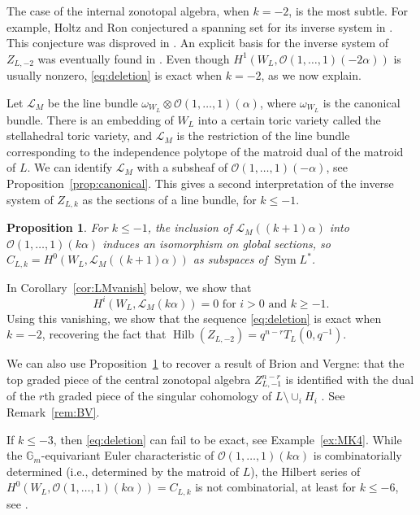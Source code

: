 \documentclass{amsart}
\newtheorem{proposition}[theorem]{Proposition}
\newcommand{\Hilb}{\operatorname{Hilb}}
\theoremstyle{definition}
\begin{document}
The case of the internal zonotopal algebra, when $k=-2$, is the most 
subtle. For example, Holtz and Ron conjectured a spanning set for its 
inverse system in \cite[Conjecture 6.1]{HoltzRon}. This conjecture was 
disproved in \cite{APCorrection}. An explicit basis for the inverse system of $Z_{L, -2}$ was eventually found in \cite[Section 4.5]{GillespieThesis}. Even though $H^1(W_L, \mathcal{O}(1, \dotsc, 1)(-2\alpha))$ is usually nonzero, \eqref{eq:deletion} is exact when $k=-2$, as we now explain. 

\medskip

Let $\mathcal{L}_M$ be the line bundle $\omega_{W_L} \otimes \mathcal{O}(1, \dotsc, 1)(\alpha)$, where $\omega_{W_L}$ is the canonical bundle. There is an embedding of $W_L$ into a certain toric variety called the stellahedral toric variety, and $\mathcal{L}_M$ is the restriction of the line bundle corresponding to the independence polytope of the matroid dual of the matroid of $L$. We can identify $\mathcal{L}_M$ with a subsheaf of $\mathcal{O}(1, \dotsc, 1)(-\alpha)$, see Proposition~\ref{prop:canonical}. This gives a second interpretation of the inverse system of $Z_{L, k}$ as the sections of a line bundle, for $k \le -1$. 

\begin{proposition}\label{prop:LM}
For $k \le -1$, the inclusion of $\mathcal{L}_M((k+1)\alpha)$ into $\mathcal{O}(1, \dotsc, 1)(k\alpha)$ induces an isomorphism on global sections, so $C_{L, k} = H^0(W_L, \mathcal{L}_M((k+1)\alpha))$ as subspaces of $\operatorname{Sym} L^*$.
\end{proposition}

In Corollary~\ref{cor:LMvanish} below, we show that
$$H^i(W_L, \mathcal{L}_M(k\alpha)) = 0 \text{ for }i >0 \text{ and }k \ge -1.$$
Using this vanishing, we show that the sequence \eqref{eq:deletion} is 
exact when $k=-2$, recovering the fact that  $\Hilb(Z_{L,-2}) = q^{n-r} T_L(0, q^{-1})$. 

We can also use Proposition~\ref{prop:LM} to recover a result of Brion and Vergne: that the top graded piece  of the central zonotopal algebra $Z_{L, -1}^{n-r}$ is identified with the dual of the $r$th graded piece of the singular cohomology of $L \setminus \cup_{i} H_i$ \cite{BrionVerge}. See Remark~\ref{rem:BV}. 

\medskip


If $k \le -3$, then \eqref{eq:deletion} can fail to be exact, see Example~\ref{ex:MK4}. 
While the $\mathbb{G}_m$-equivariant Euler characteristic of 
$\mathcal{O}(1, \dotsc, 1)(k\alpha)$ is combinatorially determined 
(i.e., determined by the matroid of $L$), the Hilbert series of 
$H^0(W_L, \mathcal{O}(1, \dotsc, 1)(k\alpha)) = C_{L, k}$ is not 
combinatorial, at least for $k \le -6$, see \cite[Proposition 4]{APCorrection}. 
\end{document}
